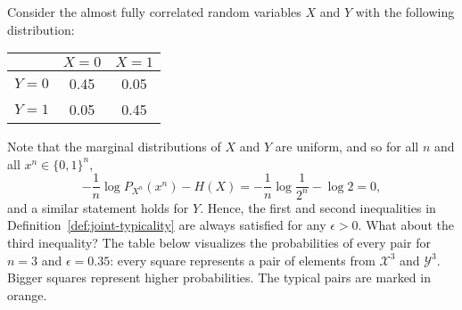 \begin{example}\label{example:joint-typicality}
Consider the almost fully correlated random variables $X$ and $Y$ with the following distribution:
\begin{center}
\begin{tabular}{c || c | c |}
&$X=0$&$X=1$\\
\hline
\hline
$Y=0$&0.45&0.05\\
$Y=1$&0.05&0.45\\
\end{tabular}
\end{center}
Note that the marginal distributions of $X$ and $Y$ are uniform, and so for all $n$ and all $x^n \in \{0,1\}^n$,
\[-\frac{1}{n} \log P_{X^n}(x^n) - H(X) = -\frac{1}{n} \log \frac{1}{2^n} - \log 2 = 0,\]
and a similar statement holds for $Y$. Hence, the first and second inequalities in Definition~\ref{def:joint-typicality} are always satisfied for any $\epsilon > 0$. What about the third inequality? The table below visualizes the probabilities of every pair for $n = 3$ and $\epsilon = 0.35$: every square represents a pair of elements from $\mathcal{X}^3$ and $\mathcal{Y}^3$. Bigger squares represent higher probabilities. The typical pairs are marked in orange.

\newcommand{\mysquare}[4]{%
	\def\size{#2}
	\def\x{#3}
	\def\y{#4}
	\fill[#1] (\x-\size*0.5, \y-\size*0.5) rectangle (\x+\size*0.5, \y+\size*0.5);
}


\begin{center}
\end{center}
\end{example}
